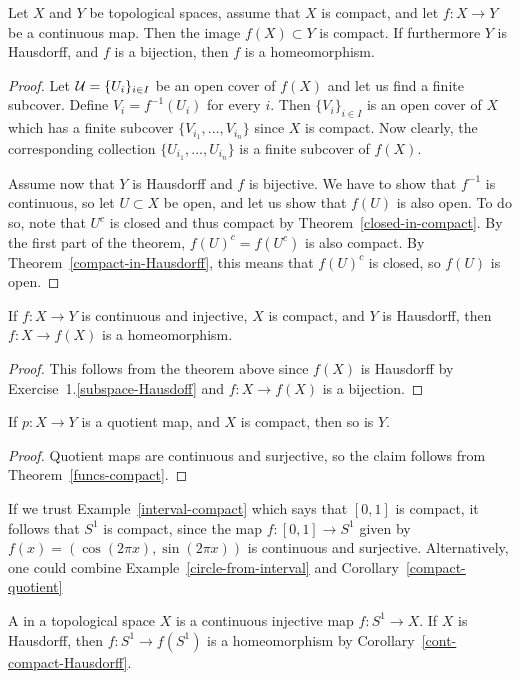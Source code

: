 \begin{thm}
  \label{funcs-compact}
  Let $X$ and $Y$ be topological spaces, assume that $X$ is compact, and let $f : X \to Y$ be a continuous map. Then the image $f(X) \subset Y$ is compact. If furthermore $Y$ is Hausdorff, and $f$ is a bijection, then $f$ is a homeomorphism.
\end{thm}
\begin{proof}
  Let $\mathcal{U} = \{U_i \}_{i \in I}$ be an open cover of $f(X)$ and let us find a finite subcover. Define $V_i = f^{-1}(U_i)$ for every $i$. Then $\{V_i\}_{i \in I}$ is an open cover of $X$ which has a finite subcover $\{V_{i_1}, \dots, V_{i_n}\}$ since $X$ is compact. Now clearly, the corresponding collection $\{U_{i_1}, \dots, U_{i_n}\}$ is a finite subcover of $f(X)$.
  
  Assume now that $Y$ is Hausdorff and $f$ is bijective. We have to show that $f^{-1}$ is continuous, so let $U \subset X$ be open, and let us show that $f(U)$ is also open. To do so, note that $U^c$ is closed and thus compact by Theorem~\ref{closed-in-compact}. By the first part of the theorem, $f(U)^c = f(U^c)$ is also compact. By Theorem~\ref{compact-in-Hausdorff}, this means that $f(U)^c$ is closed, so $f(U)$ is open.
\end{proof}
\begin{cor}
  \label{cont-compact-Hausdorff}
  If $f: X \to Y$ is continuous and injective, $X$ is compact, and $Y$ is Hausdorff, then $f : X \to f(X)$ is a homeomorphism.  
\end{cor}
\begin{proof}
  This follows from the theorem above since $f(X)$ is Hausdorff by Exercise~1.\ref{subspace-Hausdoff} and $f : X \to f(X)$ is a bijection.
\end{proof}
\begin{cor}
  \label{compact-quotient}
  If $p : X \to Y$ is a quotient map, and $X$ is compact, then so is $Y$.
\end{cor}
\begin{proof}
  Quotient maps are continuous and surjective, so the claim follows from Theorem~\ref{funcs-compact}.
\end{proof}
\begin{example}
  \label{s1-compact}
  If we trust Example~\ref{interval-compact} which says that $[0,1]$ is compact, it follows that $S^1$ is compact, since the map $f:[0,1] \to S^1$ given by $f(x) = (\cos(2\pi x),\sin(2\pi x))$ is continuous and surjective. Alternatively, one could combine Example~\ref{circle-from-interval} and Corollary~\ref{compact-quotient}
\end{example}
\begin{example}
  A  in a topological space $X$ is a continuous injective map $f : S^1 \to X$. If $X$ is Hausdorff, then $f : S^1 \to f(S^1)$ is a homeomorphism by Corollary~\ref{cont-compact-Hausdorff}.
\end{example}

